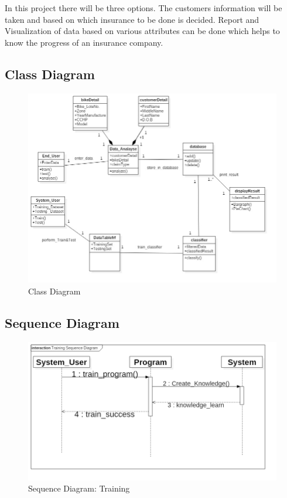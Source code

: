 In this project there will be three options. The customers information will be taken and based on which insurance to be done is decided. Report and Visualization of data based on various attributes can be done which helps to know the progress of an insurance company.
\newpage
\subsection{Class  Diagram}
\begin{figure}[tbh] %
\begin{center}
	\includegraphics[width = 6in]{images/Cd.png}
	\caption{Class Diagram} %
	\label{Class} %
\end{center}
\end{figure}


\newpage
\subsection{Sequence Diagram}
\begin{figure}[H] %
\begin{center}
	\includegraphics[width = 6in]{images/TrainingSequence.png}
	\caption{Sequence Diagram: Training} %
	\label{Sequence} %
\end{center}
\end{figure}

